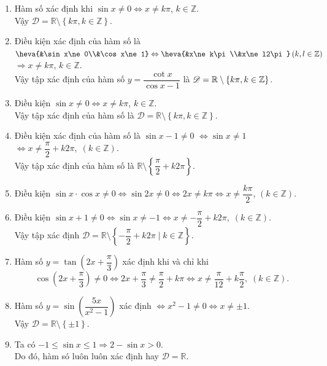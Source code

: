 \begin{ex}
{\begin{enumerate}
			\item Hàm số xác  định khi $\sin x\ne 0\Leftrightarrow x\ne k\pi$, $k\in \mathbb{Z}$. \\
			Vậy $\mathscr{D}=\mathbb{R} \setminus \left\{k\pi, k\in \mathbb{Z}\right\}$. 
			\item Điều kiện xác định của hàm số là $\heva{&\sin x\ne 0\\&\cos x\ne 1}\Leftrightarrow \heva{&x\ne k\pi\\&x\ne l2\pi} \left(k,l\in {\bf \mathbb{Z}}\right)$ $\Rightarrow  x\ne k\pi$, $ k\in \mathbb{Z}$.\\
			Vậy tập xác định của hàm số $y=\dfrac{\cot x}{\cos  x-1}$ là $\mathscr{D}=\mathbb{R}\setminus \left\{k\pi, k\in {\bf \mathbb{Z}}\right\}$.
			\item Điều kiện  $\sin x\ne 0\Leftrightarrow x\ne k\pi$, $ k\in \mathbb{Z}$. \\
			Vậy tập xác định của hàm số là $\mathscr{D}=\mathbb{R}\setminus  \left\{k\pi, k\in\mathbb{Z}\right\}$.
			 \item Điều kiện xác định của hàm số là $\sin x-1\ne 0$ $\Leftrightarrow \sin x\ne 1$ $\Leftrightarrow x\ne \dfrac{\pi}{2}+k2\pi,\; \left(k\in \mathbb{Z}\right)$.\\
			Vậy tập xác  định của hàm số là $\mathbb{R}\setminus \left\{\dfrac{\pi}{2}+k2\pi \right\}$.
			\item Điều kiện $\sin x\cdot\cos  x\ne 0\Leftrightarrow \sin 2x\ne 0\Leftrightarrow 2x\ne k\pi \Leftrightarrow x\ne \dfrac{k\pi}{2}$, $\left(k\in \mathbb{Z}\right)$.
			\item Điều kiện $\sin x+1\neq 0\Leftrightarrow \sin x\neq -1\Leftrightarrow x\neq-\dfrac{\pi}{2}+k2\pi,\;  \left(k\in \mathbb{Z}\right)$.\\
			Vậy  tập xác định $\mathscr{D}=\mathbb{R}\setminus\left\{-\dfrac{\pi}{2}+k2\pi\mid k\in \mathbb{Z}\right\}$.
			\item Hàm số $y=\tan \left(2x+\dfrac{\pi}{3} \right)$ xác định khi và chỉ khi 
			\[\cos \left(2x+\dfrac{\pi}{3} \right)\ne  0\Leftrightarrow 2x+\dfrac{\pi}{3} \ne \dfrac{\pi}{2}+k\pi \Leftrightarrow x\ne \dfrac{\pi}{12}+k\dfrac{\pi}{2},\; \left(k\in \mathbb{Z}\right).
			 \]
			\item Hàm số $y=\sin \left(\dfrac{5x}{x^2-1} \right)$ xác định $\Leftrightarrow x^2-1\ne 0\Leftrightarrow  x\ne \pm 1$. \\
			Vậy $\mathscr{D}=\mathbb{R}\setminus  \left\{\pm 1\right\}$.
			\item Ta có $-1\le \sin  x\le 1\Rightarrow 2-\sin x > 0$. \\
			Do đó, hàm só luôn luôn xác định  hay $\mathscr{D}=\mathbb{R}$.
		\end{enumerate}
	} 
\end{ex}

